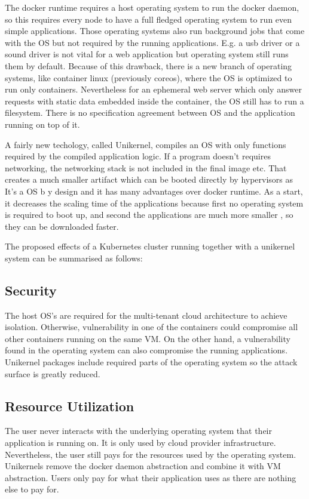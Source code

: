 The docker runtime requires a host operating system to run the docker daemon, so this requires every node to have a full fledged operating system to run even simple applications. Those operating systems also run background jobs that come with the OS but not required by the running applications. E.g. a usb driver or a sound driver is not vital for a web application but operating system still runs them by default. Because of this drawback, there is a new branch of operating systems, like container linux (previously coreos)\cite{coreos}, where the OS is optimized to run only containers. Nevertheless for an ephemeral web server which only answer requests with static data embedded inside the container, the OS still has to run a filesystem. There is no specification agreement between OS and the application running on top of it.

A fairly new techology, called Unikernel, compiles an OS with only functions required by the compiled application logic. If a program doesn't requires networking, the networking stack is not included in the final image etc. That creates a much smaller artifact which can be booted directly by hypervisors as It's a OS b y design and it has many advantages over docker runtime. As a start, it decreases the scaling time \cite{Podolskiy:2017:QCA:3069383.3069390} of the applications because first no operating system is required to boot up, and second the applications are much more smaller , so they can be downloaded faster.

The proposed effects of a Kubernetes cluster running together with a unikernel system can be summarised as follows:

\subsection{Security}
 The host OS's are required for the multi-tenant cloud architecture to achieve isolation. Otherwise, vulnerability in one of the containers could compromise all other containers running on the same VM. On the other hand, a vulnerability found in the operating system can also compromise the running applications. Unikernel packages include required parts of the operating system so the attack surface is greatly reduced.

\subsection{Resource Utilization}
The user never interacts with the underlying operating system that their application is running on. It is only used by cloud provider infrastructure. Nevertheless, the user still pays for the resources used by the operating system. Unikernels remove the docker daemon abstraction and combine it with VM abstraction. Users only pay for what their application uses as there are nothing else to pay for.


